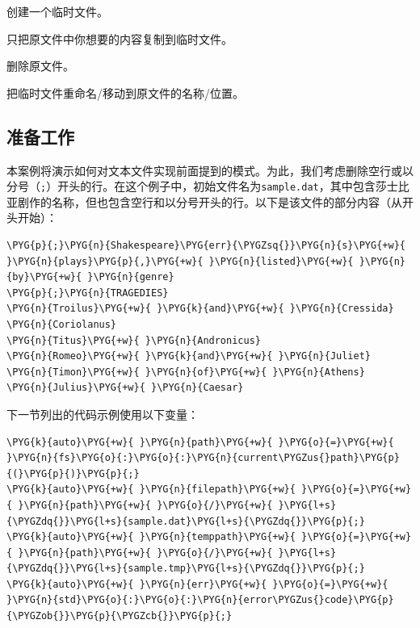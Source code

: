 
创建一个临时文件。



只把原文件中你想要的内容复制到临时文件。



删除原文件。



把临时文件重命名/移动到原文件的名称/位置。



\subsection{准备工作}



本案例将演示如何对文本文件实现前面提到的模式。为此，我们考虑删除空行或以分号（\texttt{;}）开头的行。在这个例子中，初始文件名为\texttt{sample.\allowbreak{}dat}，其中包含莎士比亚剧作的名称，但也包含空行和以分号开头的行。以下是该文件的部分内容（从开头开始）：



\begin{codeblockbg}
\begin{Verbatim}[commandchars=\\\{\},breaklines=true,breakanywhere=true,fontsize=\codefont,xleftmargin=17bp]
\PYG{p}{;}\PYG{n}{Shakespeare}\PYG{err}{\PYGZsq{}}\PYG{n}{s}\PYG{+w}{ }\PYG{n}{plays}\PYG{p}{,}\PYG{+w}{ }\PYG{n}{listed}\PYG{+w}{ }\PYG{n}{by}\PYG{+w}{ }\PYG{n}{genre}
\PYG{p}{;}\PYG{n}{TRAGEDIES}
\PYG{n}{Troilus}\PYG{+w}{ }\PYG{k}{and}\PYG{+w}{ }\PYG{n}{Cressida}
\PYG{n}{Coriolanus}
\PYG{n}{Titus}\PYG{+w}{ }\PYG{n}{Andronicus}
\PYG{n}{Romeo}\PYG{+w}{ }\PYG{k}{and}\PYG{+w}{ }\PYG{n}{Juliet}
\PYG{n}{Timon}\PYG{+w}{ }\PYG{n}{of}\PYG{+w}{ }\PYG{n}{Athens}
\PYG{n}{Julius}\PYG{+w}{ }\PYG{n}{Caesar}
\end{Verbatim}
\end{codeblockbg}



下一节列出的代码示例使用以下变量：



\begin{codeblockbg}
\begin{Verbatim}[commandchars=\\\{\},breaklines=true,breakanywhere=true,fontsize=\codefont,xleftmargin=17bp]
\PYG{k}{auto}\PYG{+w}{ }\PYG{n}{path}\PYG{+w}{ }\PYG{o}{=}\PYG{+w}{ }\PYG{n}{fs}\PYG{o}{:}\PYG{o}{:}\PYG{n}{current\PYGZus{}path}\PYG{p}{(}\PYG{p}{)}\PYG{p}{;}
\PYG{k}{auto}\PYG{+w}{ }\PYG{n}{filepath}\PYG{+w}{ }\PYG{o}{=}\PYG{+w}{ }\PYG{n}{path}\PYG{+w}{ }\PYG{o}{/}\PYG{+w}{ }\PYG{l+s}{\PYGZdq{}}\PYG{l+s}{sample.dat}\PYG{l+s}{\PYGZdq{}}\PYG{p}{;}
\PYG{k}{auto}\PYG{+w}{ }\PYG{n}{temppath}\PYG{+w}{ }\PYG{o}{=}\PYG{+w}{ }\PYG{n}{path}\PYG{+w}{ }\PYG{o}{/}\PYG{+w}{ }\PYG{l+s}{\PYGZdq{}}\PYG{l+s}{sample.tmp}\PYG{l+s}{\PYGZdq{}}\PYG{p}{;}
\PYG{k}{auto}\PYG{+w}{ }\PYG{n}{err}\PYG{+w}{ }\PYG{o}{=}\PYG{+w}{ }\PYG{n}{std}\PYG{o}{:}\PYG{o}{:}\PYG{n}{error\PYGZus{}code}\PYG{p}{\PYGZob{}}\PYG{p}{\PYGZcb{}}\PYG{p}{;}
\end{Verbatim}
\end{codeblockbg}


